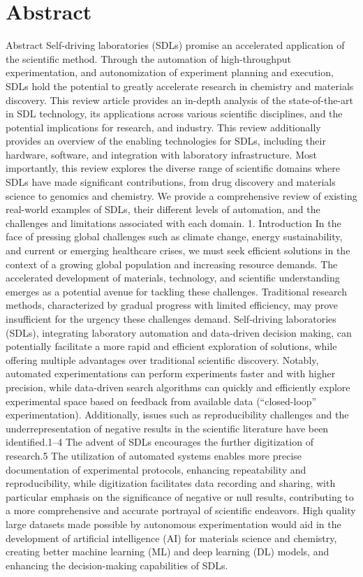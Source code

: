 \documentclass{article}
\begin{document}
\section{Abstract}
Abstract
Self-driving laboratories (SDLs) promise an accelerated application of the scientific method. Through the automation of high-throughput experimentation, and autonomization of experiment planning and execution, SDLs hold the potential to greatly accelerate research in chemistry and materials discovery. This review article provides an in-depth analysis of the state-of-the-art in SDL technology, its applications across various scientific disciplines, and the potential implications for research, and industry. This review additionally provides an overview of the enabling technologies for SDLs, including their hardware, software, and integration with laboratory infrastructure. Most importantly, this review explores the diverse range of scientific domains where SDLs have made significant contributions, from drug discovery and materials science to genomics and chemistry. We provide a comprehensive review of existing real-world examples of SDLs, their different levels of automation, and the challenges and limitations associated with each domain.
1. Introduction
In the face of pressing global challenges such as climate change, energy sustainability, and current or emerging healthcare crises, we must seek efficient solutions in the context of a growing global population and increasing resource demands. The accelerated development of materials, technology, and scientific understanding emerges as a potential avenue for tackling these challenges. Traditional research methods, characterized by gradual progress with limited efficiency, may prove insufficient for the urgency these challenges demand. Self-driving laboratories (SDLs), integrating laboratory automation and data-driven decision making, can potentially facilitate a more rapid and efficient exploration of solutions, while offering multiple advantages over traditional scientific discovery. Notably, automated experimentations can perform experiments faster and with higher precision, while data-driven search algorithms can quickly and efficiently explore experimental space based on feedback from available data (“closed-loop” experimentation). Additionally, issues such as reproducibility challenges and the underrepresentation of negative results in the scientific literature have been identified.1–4 The advent of SDLs encourages the further digitization of research.5 The utilization of automated systems enables more precise documentation of experimental protocols, enhancing repeatability and reproducibility, while digitization facilitates data recording and sharing, with particular emphasis on the significance of negative or null results, contributing to a more comprehensive and accurate portrayal of scientific endeavors. High quality large datasets made possible by autonomous experimentation would aid in the development of artificial intelligence (AI) for materials science and chemistry, creating better machine learning (ML) and deep learning (DL) models, and enhancing the decision-making capabilities of SDLs.
\end{document}
